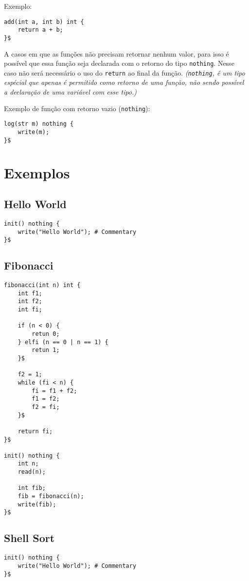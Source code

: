 \documentclass[a4paper,11pt]{article}
\begin{document}
Exemplo:
\begin{lstlisting}
add(int a, int b) int {
    return a + b;
}$
\end{lstlisting}

A casos em que as funções não precisam retornar nenhum valor, para isso é possível que essa função
seja declarada com o retorno do tipo \texttt{nothing}. Nesse caso não será necessário o uso do
\texttt{return} ao final da função. \textit{(\texttt{nothing}, é um tipo espécial que apenas é
permitido como retorno de uma função, não sendo possível a declaração de uma variável com esse tipo.)}

Exemplo de função com retorno vazio (\texttt{nothing}):
\begin{lstlisting}
log(str m) nothing {
    write(m);
}$
\end{lstlisting}

\section{Exemplos}

\subsection{Hello World}
\begin{lstlisting}
init() nothing {
    write("Hello World"); # Commentary
}$
\end{lstlisting}

\pagebreak

\subsection{Fibonacci}
\begin{lstlisting}
fibonacci(int n) int {
    int f1;
    int f2;
    int fi;

    if (n < 0) {
        retun 0;
    } elfi (n == 0 | n == 1) {
        retun 1;
    }$

    f2 = 1;
    while (fi < n) {
        fi = f1 + f2;
        f1 = f2;
        f2 = fi;
    }$

    return fi;
}$

init() nothing {
    int n;
    read(n);
    
    int fib;
    fib = fibonacci(n);
    write(fib);
}$
\end{lstlisting}

\pagebreak

\subsection{Shell Sort}
\begin{lstlisting}
init() nothing {
    write("Hello World"); # Commentary
}$
\end{lstlisting}
\end{document}

